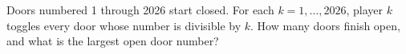 Doors numbered 1 through 2026 start closed. For each $k=1,\ldots,2026$, player $k$ toggles every door whose number is divisible by $k$. How many doors finish open, and what is the largest open door number?
